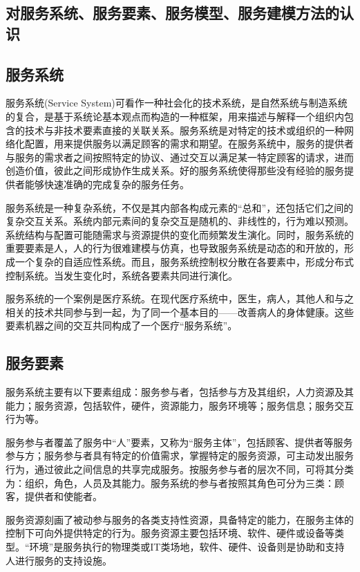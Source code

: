 \documentclass[11pt,a4paper]{article}
\begin{document}
\begin{CJK}{UTF8}{gbsn}
\section{对服务系统、服务要素、服务模型、服务建模方法的认识}

\subsection{服务系统}
 
服务系统(Service System)可看作一种社会化的技术系统，是自然系统与制造系统的复合，是基于系统论基本观点而构造的一种框架，用来描述与解释一个组织内包含的技术与非技术要素直接的关联关系。服务系统是对特定的技术或组织的一种网络化配置，用来提供服务以满足顾客的需求和期望。在服务系统中，服务的提供者与服务的需求者之间按照特定的协议、通过交互以满足某一特定顾客的请求，进而创造价值，彼此之间形成协作生成关系。好的服务系统使得那些没有经验的服务提供者能够快速准确的完成复杂的服务任务。

服务系统是一种复杂系统，不仅是其内部各构成元素的“总和”，还包括它们之间的复杂交互关系。系统内部元素间的复杂交互是随机的、非线性的，行为难以预测。系统结构与配置可能随需求与资源提供的变化而频繁发生演化。同时，服务系统的重要要素是人，人的行为很难建模与仿真，也导致服务系统是动态的和开放的，形成一个复杂的自适应性系统。而且，服务系统控制权分散在各要素中，形成分布式控制系统。当发生变化时，系统各要素共同进行演化。 

服务系统的一个案例是医疗系统。在现代医疗系统中，医生，病人，其他人和与之相关的技术共同参与到一起，为了同一个基本目的——改善病人的身体健康。这些要素机器之间的交互共同构成了一个医疗“服务系统”。

\subsection{服务要素}

服务系统主要有以下要素组成：服务参与者，包括参与方及其组织，人力资源及其能力；服务资源，包括软件，硬件，资源能力，服务环境等；服务信息；服务交互行为等。

服务参与者覆盖了服务中“人”要素，又称为“服务主体”，包括顾客、提供者等服务参与方；服务参与者具有特定的价值需求，掌握特定的服务资源，可主动发出服务行为，通过彼此之间信息的共享完成服务。按服务参与者的层次不同，可将其分类为：组织，角色，人员及其能力。服务系统的参与者按照其角色可分为三类：顾客，提供者和使能者。

服务资源刻画了被动参与服务的各类支持性资源，具备特定的能力，在服务主体的控制下可向外提供特定的行为。服务资源主要包括环境、软件、硬件或设备等类型。“环境”是服务执行的物理类或IT类场地，软件、硬件、设备则是协助和支持人进行服务的支持设施。


\end{CJK}
\end{document}
